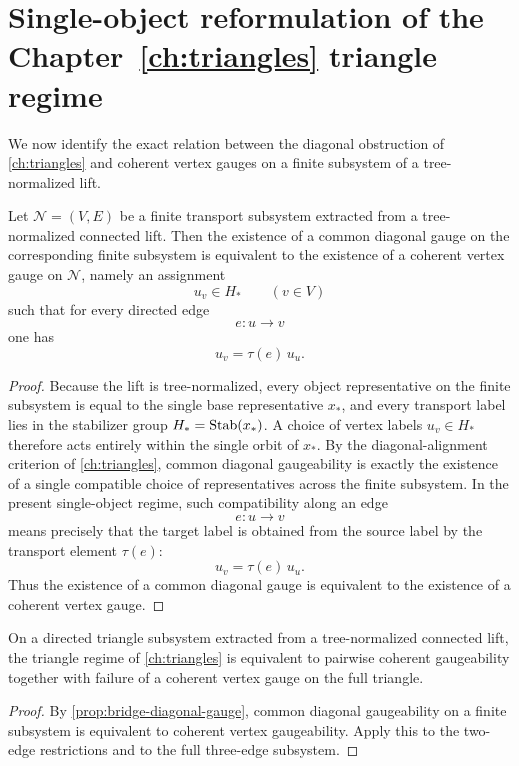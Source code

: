 \section{Single-object reformulation of the Chapter~\ref{ch:triangles} triangle regime}
We now identify the exact relation between the diagonal obstruction of
\cref{ch:triangles} and coherent vertex gauges on a finite subsystem of
a tree-normalized lift.
\begin{proposition}
	\label{prop:bridge-diagonal-gauge}
	Let \(\mathcal N=(V,E)\) be a finite transport subsystem extracted from
	a tree-normalized connected lift. Then the existence of a common
	diagonal gauge on the corresponding finite subsystem is equivalent to
	the existence of a coherent vertex gauge on \(\mathcal N\), namely an
	assignment
	\[
		u_v\in H_*
		\qquad
		(v\in V)
	\]
	such that for every directed edge
	\[
		e:u\to v
	\]
	one has
	\[
		u_v=\tau(e)\,u_u.
	\]
\end{proposition}
\begin{proof}
	Because the lift is tree-normalized, every object representative on the
	finite subsystem is equal to the single base representative \(x_*\), and
	every transport label lies in the stabilizer group \(H_*=\operatorname{Stab}(x_*)\). A
	choice of vertex labels \(u_v\in H_*\) therefore acts entirely within the
	single orbit of \(x_*\).
	By the diagonal-alignment criterion of \cref{ch:triangles}, common
	diagonal gaugeability is exactly the existence of a single compatible
	choice of representatives across the finite subsystem. In the present
	single-object regime, such compatibility along an edge
	\[
		e:u\to v
	\]
	means precisely that the target label is obtained from the source label
	by the transport element \(\tau(e)\):
	\[
		u_v=\tau(e)\,u_u.
	\]
	Thus the existence of a common diagonal gauge is equivalent to the
	existence of a coherent vertex gauge.
\end{proof}
\begin{corollary}
	\label{cor:bridge-triangle-regime}
	On a directed triangle subsystem extracted from a tree-normalized
	connected lift, the triangle regime of \cref{ch:triangles} is
	equivalent to pairwise coherent gaugeability together with failure of a
	coherent vertex gauge on the full triangle.
\end{corollary}
\begin{proof}
	By \cref{prop:bridge-diagonal-gauge}, common diagonal gaugeability on a
	finite subsystem is equivalent to coherent vertex gaugeability. Apply
	this to the two-edge restrictions and to the full three-edge subsystem.
\end{proof}
